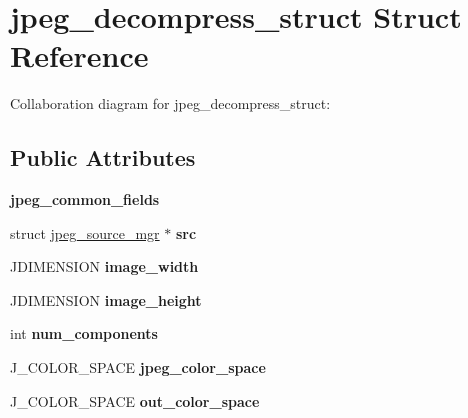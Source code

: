 \hypertarget{structjpeg__decompress__struct}{\section{jpeg\+\_\+decompress\+\_\+struct Struct Reference}
\label{structjpeg__decompress__struct}
}


Collaboration diagram for jpeg\+\_\+decompress\+\_\+struct\+:
\subsection*{Public Attributes}
\begin{DoxyCompactItemize}
\item 
\hypertarget{structjpeg__decompress__struct_a62d872add9f188d06908d327da2a24fd}{{\bfseries jpeg\+\_\+common\+\_\+fields}}\label{structjpeg__decompress__struct_a62d872add9f188d06908d327da2a24fd}

\item 
\hypertarget{structjpeg__decompress__struct_aa0f9a673100231cfd81f17b789784785}{struct \hyperlink{structjpeg__source__mgr}{jpeg\+\_\+source\+\_\+mgr} $\ast$ {\bfseries src}}\label{structjpeg__decompress__struct_aa0f9a673100231cfd81f17b789784785}

\item 
\hypertarget{structjpeg__decompress__struct_a433c0a54f42dfd3d2977ea967b9a21ee}{J\+D\+I\+M\+E\+N\+S\+I\+O\+N {\bfseries image\+\_\+width}}\label{structjpeg__decompress__struct_a433c0a54f42dfd3d2977ea967b9a21ee}

\item 
\hypertarget{structjpeg__decompress__struct_ad711fae8063a3e75e3c0cccd8512bedf}{J\+D\+I\+M\+E\+N\+S\+I\+O\+N {\bfseries image\+\_\+height}}\label{structjpeg__decompress__struct_ad711fae8063a3e75e3c0cccd8512bedf}

\item 
\hypertarget{structjpeg__decompress__struct_a15d5e8c34e5c66983eda5c0070f0be95}{int {\bfseries num\+\_\+components}}\label{structjpeg__decompress__struct_a15d5e8c34e5c66983eda5c0070f0be95}

\item 
\hypertarget{structjpeg__decompress__struct_a980b92cd751cbc72cc7edd1f9ef2c3e4}{J\+\_\+\+C\+O\+L\+O\+R\+\_\+\+S\+P\+A\+C\+E {\bfseries jpeg\+\_\+color\+\_\+space}}\label{structjpeg__decompress__struct_a980b92cd751cbc72cc7edd1f9ef2c3e4}

\item 
\hypertarget{structjpeg__decompress__struct_a4e69e870df7b81671043374d01efc14f}{J\+\_\+\+C\+O\+L\+O\+R\+\_\+\+S\+P\+A\+C\+E {\bfseries out\+\_\+color\+\_\+space}}\label{structjpeg__decompress__struct_a4e69e870df7b81671043374d01efc14f}


\end{DoxyCompactItemize}
